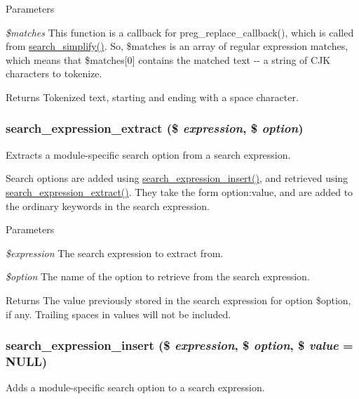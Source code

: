 \begin{DoxyParams}{Parameters}
\item[{\em \$matches}]This function is a callback for preg\_\-replace\_\-callback(), which is called from \hyperlink{search_8module_ac33f1e93d9bed7ebf9b4908287618beb}{search\_\-simplify()}. So, \$matches is an array of regular expression matches, which means that \$matches\mbox{[}0\mbox{]} contains the matched text -\/-\/ a string of CJK characters to tokenize.\end{DoxyParams}
\begin{DoxyReturn}{Returns}
Tokenized text, starting and ending with a space character. 
\end{DoxyReturn}
\hypertarget{search_8module_a6d0e1560509bebe41ba4c6a2959ce59c}{
\subsubsection[{search\_\-expression\_\-extract}]{\setlength{\rightskip}{0pt plus 5cm}search\_\-expression\_\-extract (\$ {\em expression}, \/  \$ {\em option})}}
\label{search_8module_a6d0e1560509bebe41ba4c6a2959ce59c}
Extracts a module-\/specific search option from a search expression.

Search options are added using \hyperlink{search_8module_a90b4fc5f716558dc1bf741c239fe1a0e}{search\_\-expression\_\-insert()}, and retrieved using \hyperlink{search_8module_a6d0e1560509bebe41ba4c6a2959ce59c}{search\_\-expression\_\-extract()}. They take the form option:value, and are added to the ordinary keywords in the search expression.


\begin{DoxyParams}{Parameters}
\item[{\em \$expression}]The search expression to extract from. \item[{\em \$option}]The name of the option to retrieve from the search expression.\end{DoxyParams}
\begin{DoxyReturn}{Returns}
The value previously stored in the search expression for option \$option, if any. Trailing spaces in values will not be included. 
\end{DoxyReturn}
\hypertarget{search_8module_a90b4fc5f716558dc1bf741c239fe1a0e}{
\subsubsection[{search\_\-expression\_\-insert}]{\setlength{\rightskip}{0pt plus 5cm}search\_\-expression\_\-insert (\$ {\em expression}, \/  \$ {\em option}, \/  \$ {\em value} = {\ttfamily NULL})}}
\label{search_8module_a90b4fc5f716558dc1bf741c239fe1a0e}
Adds a module-\/specific search option to a search expression.

